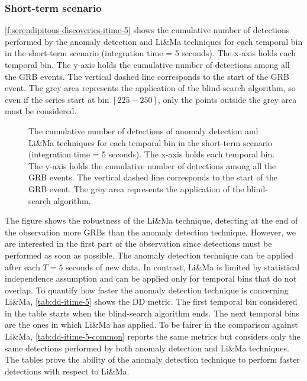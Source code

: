 \subsubsection{Short-term scenario}
\label{s:Serendipitous-Discoveries-Results-Short-Term}
\autoref{f:serendipitous-discoveries-itime-5} shows the cumulative number of detections performed by the anomaly detection and Li\&Ma techniques for each temporal bin in the short-term scenario (integration time = 5 seconds). The x-axis holds each temporal bin. The y-axis holds the cumulative number of detections among all the GRB events.  The vertical dashed line corresponds to the start of the GRB event. The grey area represents the application of the blind-search algorithm, so even if the series start at bin $[225-250]$, only the points outside the grey area must be considered.
\begin{figure}[!ht]
\centering

\captionsetup{width=0.9\linewidth}
\caption{The cumulative number of detections of anomaly detection and Li\&Ma techniques for each temporal bin in the short-term scenario (integration time = 5 seconds). The x-axis holds each temporal bin. The y-axis holds the cumulative number of detections among all the GRB events. The vertical dashed line corresponds to the start of the GRB event. The grey area represents the application of the blind-search algorithm.}
\label{f:serendipitous-discoveries-itime-5}
\end{figure}
The figure shows the robustness of the Li\&Ma technique, detecting at the end of the observation more GRBs than the anomaly detection technique. However, we are interested in the first part of the observation since detections must be performed as soon as possible. The anomaly detection technique can be applied after each $T=5$ seconds of new data. In contrast, Li\&Ma is limited by statistical independence assumption and can be applied only for temporal bins that do not overlap. To quantify how faster the anomaly detection technique is concerning Li\&Ma, \autoref{tab:dd-itime-5} shows the DD metric. The first temporal bin considered in the table starts when the blind-search algorithm ends. The next temporal bins are the ones in which Li\&Ma has applied. To be fairer in the comparison against Li\&Ma, \autoref{tab:dd-itime-5-common} reports the same metrics but considers only the same detections performed by both anomaly detection and Li\&Ma techniques. The tables prove the ability of the anomaly detection technique to perform faster detections with respect to Li\&Ma.


